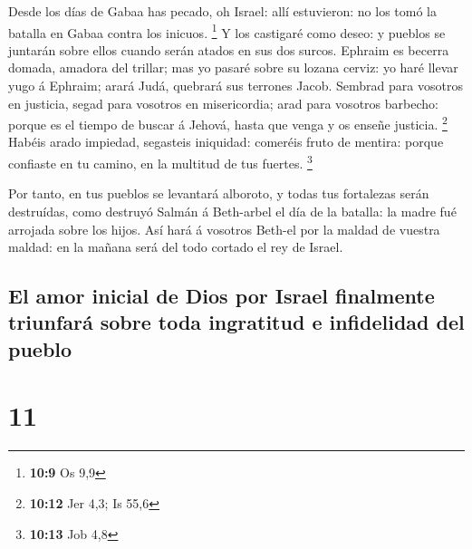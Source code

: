  Desde los días de Gabaa has pecado, oh Israel: allí
estuvieron: no los tomó la batalla en Gabaa contra los inicuos.
\footnote{\textbf{10:9} Os 9,9}  Y los castigaré como
deseo: y pueblos se juntarán sobre ellos cuando serán atados en sus dos
surcos.  Ephraim es becerra domada, amadora del trillar;
mas yo pasaré sobre su lozana cerviz: yo haré llevar yugo á Ephraim;
arará Judá, quebrará sus terrones Jacob.  Sembrad para
vosotros en justicia, segad para vosotros en misericordia; arad para
vosotros barbecho: porque es el tiempo de buscar á Jehová, hasta que
venga y os enseñe justicia. \footnote{\textbf{10:12} Jer 4,3; Is 55,6}
 Habéis arado impiedad, segasteis iniquidad: comeréis fruto
de mentira: porque confiaste en tu camino, en la multitud de tus
fuertes. \footnote{\textbf{10:13} Job 4,8}

 Por tanto, en tus pueblos se levantará alboroto, y todas
tus fortalezas serán destruídas, como destruyó Salmán á Beth-arbel el
día de la batalla: la madre fué arrojada sobre los hijos. 
Así hará á vosotros Beth-el por la maldad de vuestra maldad: en la
mañana será del todo cortado el rey de Israel.

\hypertarget{el-amor-inicial-de-dios-por-israel-finalmente-triunfaruxe1-sobre-toda-ingratitud-e-infidelidad-del-pueblo}{%
\subsection{El amor inicial de Dios por Israel finalmente triunfará
sobre toda ingratitud e infidelidad del
pueblo}\label{el-amor-inicial-de-dios-por-israel-finalmente-triunfaruxe1-sobre-toda-ingratitud-e-infidelidad-del-pueblo}}

\hypertarget{section-10}{%
\section{11}\label{section-10}}

